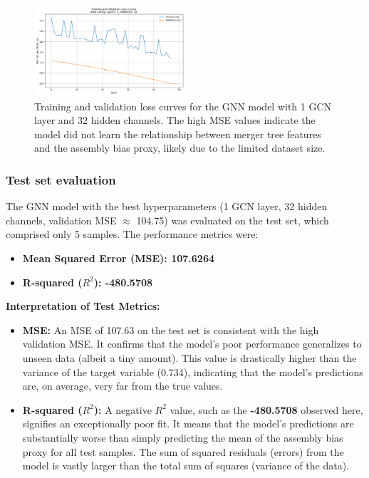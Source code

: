 \documentclass[twocolumn]{aastex631}
\begin{document}
\begin{figure}[htbp]
    \centering
    \includegraphics[width=0.5\textwidth]{../input_files/plots/training_validation_loss_curves_plot_1_1748137938.png}
    \caption{\label{fig:training_validation_loss}Training and validation loss curves for the GNN model with 1 GCN layer and 32 hidden channels. The high MSE values indicate the model did not learn the relationship between merger tree features and the assembly bias proxy, likely due to the limited dataset size.}
\end{figure}

\subsubsection{Test set evaluation}
The GNN model with the best hyperparameters (1 GCN layer, 32 hidden channels, validation MSE $\approx$ 104.75) was evaluated on the test set, which comprised only 5 samples. The performance metrics were:
\begin{itemize}
    \item \textbf{Mean Squared Error (MSE): 107.6264}
    \item \textbf{R-squared ($R^2$): -480.5708}
\end{itemize}

\textbf{Interpretation of Test Metrics:}
\begin{itemize}
    \item \textbf{MSE:} An MSE of 107.63 on the test set is consistent with the high validation MSE. It confirms that the model's poor performance generalizes to unseen data (albeit a tiny amount). This value is drastically higher than the variance of the target variable (0.734), indicating that the model's predictions are, on average, very far from the true values.
    \item \textbf{R-squared ($R^2$):} A negative $R^2$ value, such as the \textbf{-480.5708} observed here, signifies an exceptionally poor fit. It means that the model's predictions are substantially worse than simply predicting the mean of the assembly bias proxy for all test samples. The sum of squared residuals (errors) from the model is vastly larger than the total sum of squares (variance of the data).
\end{itemize}
\end{document}

